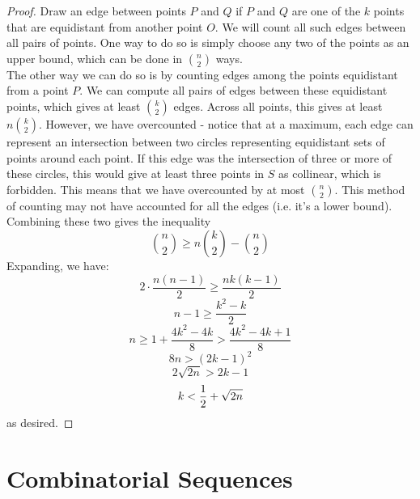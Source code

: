 \begin{proof}
Draw an edge between points $P$ and $Q$ if $P$ and $Q$ are one of the $k$ points 
that are equidistant from another point $O$. We will count all such edges between all 
pairs of points. One way to do so is simply choose any two of the points
as an upper bound, which can be done in $\binom{n}{2}$ ways. \\
The other way we can do so is by counting edges among the points equidistant
from a point $P$. We can compute all pairs of edges between these equidistant
points, which gives at least $\binom{k}{2}$ edges. Across all points, this gives at 
least $n\binom{k}{2}$. However, we have overcounted - notice that at a maximum,
each edge can represent an intersection between two circles representing 
equidistant sets of points around each point. If this edge was the intersection 
of three or more of these circles, this would give at least three points in $S$ 
as collinear, which is forbidden. This means that we have overcounted by at most
$\binom{n}{2}$. This method of counting may not have accounted for all the edges
(i.e. it's a lower bound). Combining these two gives the inequality 
\[
	\binom{n}{2} \geq n\binom{k}{2} - \binom{n}{2}
\]
Expanding, we have: 
\[
	2\cdot \frac{n(n-1)}{2} \geq \frac{nk(k-1)}{2}
\] 
\[
	n - 1 \geq \frac{k^2 - k}{2}
\]
\[
	n \geq 1 + \frac{4k^2 - 4k}{8} > \frac{4k^2 - 4k + 1}{8}
\]	
\[
	8n > (2k-1)^2
\]
\[
	2\sqrt{2n} > 2k - 1
\]
\[
	k < \frac{1}{2} + \sqrt{2n}
\]
as desired.
\end{proof}

\section{Combinatorial Sequences}
